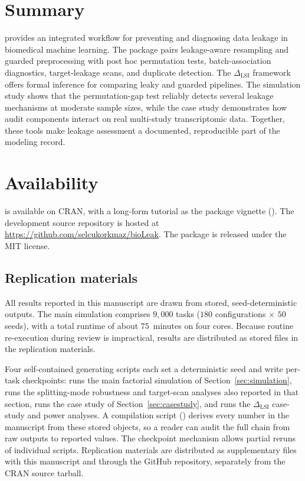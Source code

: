 \documentclass[article,shortnames]{jss}
\begin{document}
\section{Summary}\label{sec:summary}

 provides an integrated  workflow for preventing
and diagnosing data leakage in biomedical machine learning. The package pairs
leakage-aware resampling and guarded preprocessing with post hoc permutation
tests, batch-association diagnostics, target-leakage scans, and duplicate
detection. The $\Delta_{\mathrm{LSI}}$ framework offers formal inference for
comparing leaky and guarded pipelines. The simulation study shows that the
permutation-gap test reliably detects several leakage mechanisms at moderate
sample sizes, while the case study demonstrates how audit components interact
on real multi-study transcriptomic data. Together, these tools make leakage
assessment a documented, reproducible part of the modeling record.

\section{Availability}\label{sec:availability}

 is available on CRAN, with a long-form tutorial as the
package vignette (). The development source repository
is hosted at \url{https://github.com/selcukorkmaz/bioLeak}. The package is
released under the MIT license.

\subsection*{Replication materials}

All results reported in this manuscript are drawn from stored,
seed-deterministic outputs. The main simulation comprises $9{,}000$ tasks
($180$ configurations $\times$ $50$ seeds), with a total runtime of about
$75$~minutes on four cores. Because routine re-execution during review is
impractical, results are distributed as stored  files in the
replication materials.

Four self-contained generating scripts each set a deterministic seed and
write per-task checkpoints:  runs the main
factorial simulation of Section~\ref{sec:simulation},
 runs the splitting-mode robustness and
target-scan analyses also reported in that section,
 runs the  case study of
Section~\ref{sec:casestudy}, and  runs the
$\Delta_{\mathrm{LSI}}$ case-study and power analyses. A compilation script
() derives every number in the manuscript from
these stored objects, so a reader can audit the full chain from raw outputs
to reported values. The checkpoint mechanism allows partial reruns of
individual scripts. Replication materials are distributed as
supplementary files with this manuscript and through the GitHub repository,
separately from the CRAN source tarball.
\end{document}
